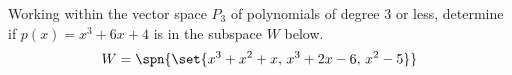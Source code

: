 Working within the vector space $P_3$ of polynomials of degree 3 or less, determine if $p(x)=x^3+6x+4$ is in the subspace $W$ below.
%
\begin{equation*}
W=\spn{\set{x^3+x^2+x,\,x^3+2x-6,\,x^2-5}}
\end{equation*}
%